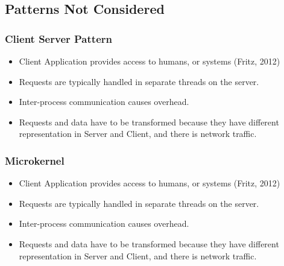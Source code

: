 \documentclass[a4paper,12pt]{article}
\begin{document}
\subsection{Patterns Not Considered}
\subsubsection{Client Server Pattern}

\begin{itemize}

\item Client Application provides access to humans, or systems (Fritz, 2012)
\item Requests are typically handled in separate threads on the server.
\item Inter-process communication causes overhead.
\item Requests and data have to be transformed because they have different representation in Server and Client, and there is network traffic.
\end{itemize}

\subsubsection{Microkernel}
\begin{itemize}

\item Client Application provides access to humans, or systems (Fritz, 2012)
\item Requests are typically handled in separate threads on the server.
\item Inter-process communication causes overhead.
\item Requests and data have to be transformed because they have different representation in Server and Client, and there is network traffic.
\end{itemize}
\end{document}
